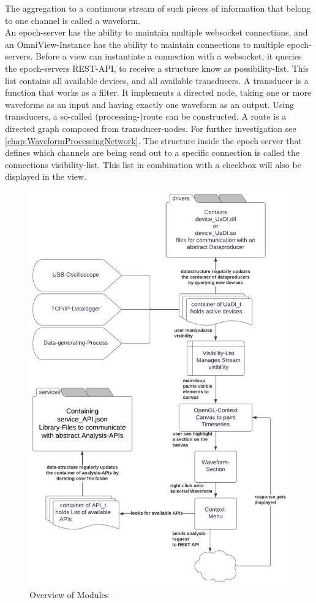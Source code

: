 \documentclass[]{scrreprt}
\begin{document}
The aggregation to a continuous stream of such pieces of information that belong to one channel is called a waveform. 
\\
An epoch-server has the ability to maintain multiple websocket connections, and an OmniView-Instance has the ability to maintain connections to multiple epoch-servers. 
Before a view can instantiate a connection with a websocket, it queries the epoch-servers REST-API, to receive a structure know as possibility-list.
This list contains all available devices, and all available transducers. 
A transducer is a function that works as a filter.
It implements a directed node, taking one or more waveforms as an input and having exactly one waveform as an output. 
Using transducers, a so-called (processing-)route can be constructed. 
A route is a directed graph composed from transducer-nodes. 
For further investigation see \ref{chap:WaveformProcessingNetwork}.
The structure inside the epoch server that defines which channels are being send out to a specific connection is called the connections visibility-list. 
This list in combination with a checkbox will also be displayed in the view.

\begin{figure}
    \includegraphics[width=.9\textwidth]{./assets/pictures/overview.pdf}
    \caption{Overview of Modules}
    \label{fig:Overview}
\end{figure}
\end{document}
